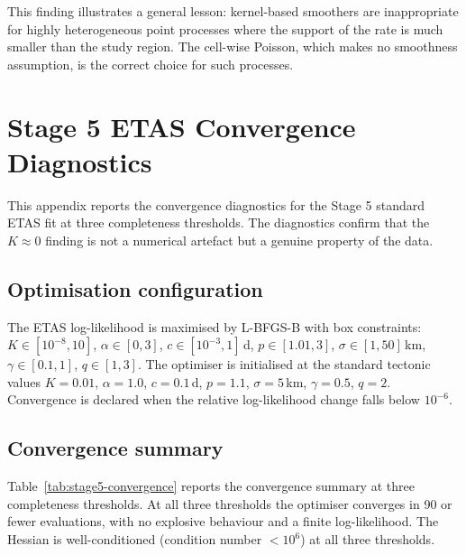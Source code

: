 \documentclass[10pt,a4paper,twocolumn]{article}
\begin{document}
This finding illustrates a general lesson: kernel-based smoothers are inappropriate for highly heterogeneous point processes where the support of the rate is much smaller than the study region. The cell-wise Poisson, which makes no smoothness assumption, is the correct choice for such processes.

\section{Stage 5 ETAS Convergence Diagnostics}\label{app:stage5-convergence}

This appendix reports the convergence diagnostics for the Stage 5 standard ETAS fit at three completeness thresholds. The diagnostics confirm that the $K\approx0$ finding is not a numerical artefact but a genuine property of the data.

\subsection{Optimisation configuration}

The ETAS log-likelihood is maximised by L-BFGS-B with box constraints: $K\in[10^{-8}, 10]$, $\alpha\in[0, 3]$, $c\in[10^{-3}, 1]$\,d, $p\in[1.01, 3]$, $\sigma\in[1, 50]$\,km, $\gamma\in[0.1, 1]$, $q\in[1, 3]$. The optimiser is initialised at the standard tectonic values $K=0.01$, $\alpha=1.0$, $c=0.1$\,d, $p=1.1$, $\sigma=5$\,km, $\gamma=0.5$, $q=2$. Convergence is declared when the relative log-likelihood change falls below $10^{-6}$.

\subsection{Convergence summary}

Table~\ref{tab:stage5-convergence} reports the convergence summary at three completeness thresholds. At all three thresholds the optimiser converges in 90 or fewer evaluations, with no explosive behaviour and a finite log-likelihood. The Hessian is well-conditioned (condition number $< 10^6$) at all three thresholds.
\end{document}
